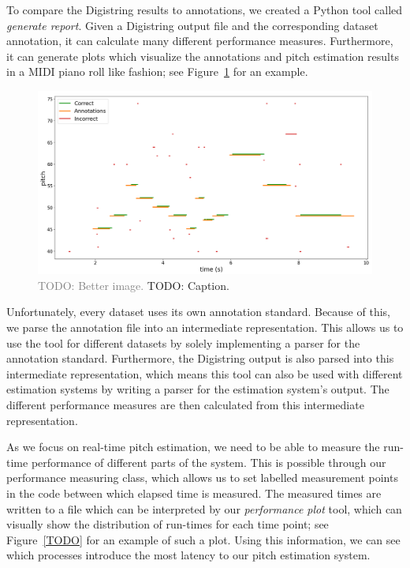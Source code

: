 \documentclass[a4paper,10pt,twocolumn]{article}
\begin{document}
To compare the Digistring results to annotations, we created a Python tool called \textit{generate report}. Given a Digistring output file and the corresponding dataset annotation, it can calculate many different performance measures. Furthermore, it can generate plots which visualize the annotations and pitch estimation results in a MIDI piano roll like fashion; see Figure~\ref{fig:pianoroll} for an example.
\begin{figure}[h]
    \centering
    \includegraphics[width=\linewidth]{fig/generate_report.png}
    \caption{\textcolor{gray}{TODO: Better image.} TODO: Caption.}
    \label{fig:pianoroll}
\end{figure}
Unfortunately, every dataset uses its own annotation standard. Because of this, we parse the annotation file into an intermediate representation. This allows us to use the tool for different datasets by solely implementing a parser for the annotation standard. Furthermore, the Digistring output is also parsed into this intermediate representation, which means this tool can also be used with different estimation systems by writing a parser for the estimation system's output. The different performance measures are then calculated from this intermediate representation.

As we focus on real-time pitch estimation, we need to be able to measure the run-time performance of different parts of the system. This is possible through our performance measuring class, which allows us to set labelled measurement points in the code between which elapsed time is measured. The measured times are written to a file which can be interpreted by our \textit{performance plot} tool, which can visually show the distribution of run-times for each time point; see Figure~\ref{TODO} for an example of such a plot. Using this information, we can see which processes introduce the most latency to our pitch estimation system.
\end{document}
